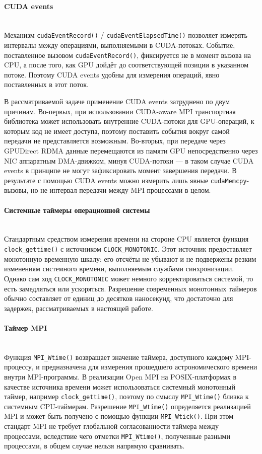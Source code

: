 \documentclass[a4paper,14pt]{extarticle}
\begin{document}
\paragraph{CUDA events}\mbox{}\\
\indent Механизм \texttt{cudaEventRecord()} / \texttt{cudaEventElapsedTime()} позволяет измерять интервалы между операциями, выполняемыми в CUDA-потоках. Событие, поставленное вызовом \texttt{cudaEventRecord()}, фиксируется не в момент вызова на CPU, а после того, как GPU дойдёт до соответствующей позиции в указанном потоке. Поэтому CUDA events удобны для измерения операций, явно поставленных в этот поток.

В рассматриваемой задаче применение CUDA events затруднено по двум причинам. Во-первых, при использовании CUDA-aware MPI транспортная библиотека может использовать внутренние CUDA-потоки для GPU-операций, к которым код не имеет доступа, поэтому поставить события вокруг самой передачи не представляется возможным. Во-вторых, при передаче через GPUDirect RDMA данные перемещаются из памяти GPU непосредственно через NIC аппаратным DMA-движком, минуя CUDA-потоки --- в таком случае CUDA events в принципе не могут зафиксировать момент завершения передачи. В результате с помощью CUDA events можно измерить лишь явные \texttt{cudaMemcpy}-вызовы, но не интервал передачи между MPI-процессами в целом.

\paragraph{Системные таймеры операционной системы}\mbox{}\\
\indent Стандартным средством измерения времени на стороне CPU является функция \texttt{clock\_gettime()} с источником \texttt{CLOCK\_MONOTONIC}. Этот источник предоставляет монотонную временную шкалу: его отсчёты не убывают и не подвержены резким изменениям системного времени, выполняемым службами синхронизации. Однако сам ход \texttt{CLOCK\_MONOTONIC} может немного корректироваться системой, то есть замедляться или ускоряться. Разрешение современных монотонных таймеров обычно составляет от единиц до десятков наносекунд, что достаточно для задержек, рассматриваемых в настоящей работе.

\paragraph{Таймер MPI}\mbox{}\\
\indent Функция \texttt{MPI\_Wtime()} возвращает значение таймера, доступного каждому MPI-процессу, и предназначена для измерения прошедшего астрономического времени внутри MPI-программы. В реализации Open MPI на POSIX-платформах в качестве источника времени может использоваться системный монотонный таймер, например \texttt{clock\_gettime()}, поэтому по смыслу \texttt{MPI\_Wtime()} близка к системным CPU-таймерам. Разрешение \texttt{MPI\_Wtime()} определяется реализацией MPI и может быть получено с помощью функции \texttt{MPI\_Wtick()}. При этом стандарт MPI не требует глобальной согласованности таймера между процессами, вследствие чего отметки \texttt{MPI\_Wtime()}, полученные разными процессами, в общем случае нельзя напрямую сравнивать.
\end{document}
